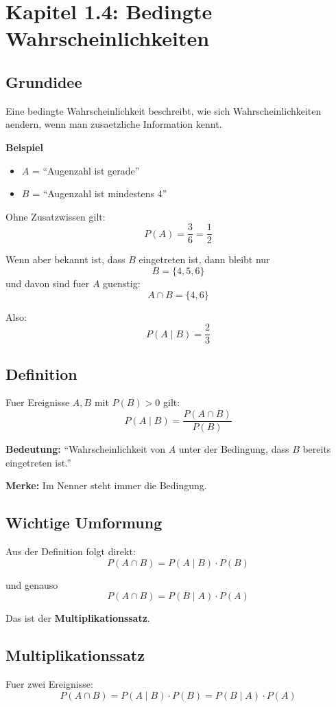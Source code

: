 \documentclass[a4paper,11pt]{article}
\begin{document}
\section{Kapitel 1.4: Bedingte Wahrscheinlichkeiten}

\subsection{Grundidee}
Eine bedingte Wahrscheinlichkeit beschreibt, wie sich Wahrscheinlichkeiten aendern, wenn man zusaetzliche Information kennt.

\textbf{Beispiel}
\begin{itemize}
  \item $A$ = ``Augenzahl ist gerade''
  \item $B$ = ``Augenzahl ist mindestens 4''
\end{itemize}

Ohne Zusatzwissen gilt:
\[
P(A)=\frac{3}{6}=\frac{1}{2}
\]

Wenn aber bekannt ist, dass $B$ eingetreten ist, dann bleibt nur
\[
B=\{4,5,6\}
\]
und davon sind fuer $A$ guenstig:
\[
A \cap B=\{4,6\}
\]

Also:
\[
P(A\mid B)=\frac{2}{3}
\]

\subsection{Definition}
Fuer Ereignisse $A,B$ mit $P(B)>0$ gilt:
\[
P(A\mid B)=\frac{P(A \cap B)}{P(B)}
\]

\textbf{Bedeutung:}
``Wahrscheinlichkeit von $A$ unter der Bedingung, dass $B$ bereits eingetreten ist.''

\textbf{Merke:}
Im Nenner steht immer die Bedingung.

\subsection{Wichtige Umformung}
Aus der Definition folgt direkt:
\[
P(A \cap B)=P(A\mid B)\cdot P(B)
\]

und genauso
\[
P(A \cap B)=P(B\mid A)\cdot P(A)
\]

Das ist der \textbf{Multiplikationssatz}.

\subsection{Multiplikationssatz}
Fuer zwei Ereignisse:
\[
P(A \cap B)=P(A\mid B)\cdot P(B)=P(B\mid A)\cdot P(A)
\]
\end{document}
